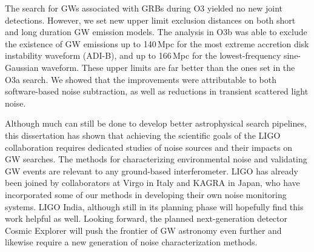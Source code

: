 The search for GWs associated with GRBs during O3 yielded no new joint detections.
However, we set new upper limit exclusion distances on both short and long duration GW emission models.
The \xpip analysis in O3b was able to exclude the existence of GW emissions up to 140\,Mpc for the most extreme accretion disk instability waveform (ADI-B), and up to 166\,Mpc for the lowest-frequency sine-Gaussian waveform.
These upper limits are far better than the ones set in the O3a search.
We showed that the improvements were attributable to both software-based noise subtraction, as well as reductions in transient scattered light noise.

Although much can still be done to develop better astrophysical search pipelines, this dissertation has shown that achieving the scientific goals of the LIGO collaboration requires dedicated studies of noise sources and their impacts on GW searches.
The methods for characterizing environmental noise and validating GW events are relevant to any ground-based interferometer.
LIGO has already been joined by collaborators at Virgo in Italy and KAGRA in Japan, who have incorporated some of our methods in developing their own noise monitoring systems.
LIGO India, although still in its planning phase will hopefully find this work helpful as well.
Looking forward, the planned next-generation detector Cosmic Explorer will push the frontier of GW astronomy even further and likewise require a new generation of noise characterization methods.
